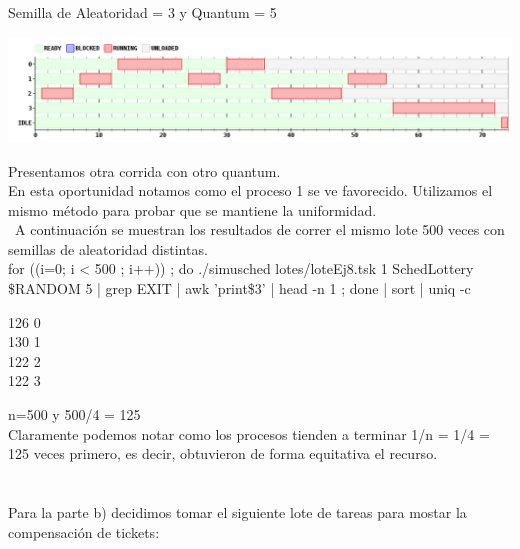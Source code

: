Semilla de Aleatoridad = 3 y Quantum = 5
\begin {center}
\includegraphics[width=16cm]{../simusched/outputs/ej8/sl-ej8-3-5.png}
\end {center}
Presentamos otra corrida con otro quantum.\\
En esta oportunidad notamos como el proceso 1 se ve favorecido.
Utilizamos el mismo método para probar que se mantiene la uniformidad.\\\
A continuación se muestran los resultados de correr el mismo lote 500 veces con semillas de aleatoridad distintas.\\
for ((i=0; i < 500 ; i++)) ; do ./simusched lotes/loteEj8.tsk 1 SchedLottery \$RANDOM 5 | grep EXIT | awk '{print\$3}' | head -n 1 ; done | sort | uniq -c\\
\begin {center}   
    126 0\\
    130 1\\
    122 2\\
    122 3\\
\end {center}   
n=500 y 500/4 = 125\\
Claramente podemos notar como los procesos tienden a terminar 1/n = 1/4 = 125 veces primero, es decir, obtuvieron de forma equitativa el recurso.\\
\hbox{}\\
\hbox{}\\
Para la parte b) decidimos tomar el siguiente lote de tareas para mostar la compensación de tickets:

